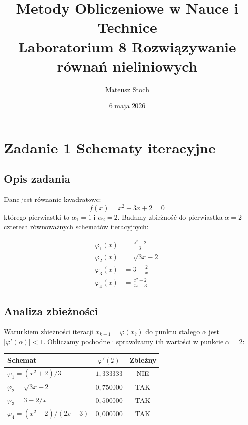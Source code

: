 \documentclass[12pt, a4paper]{article}
\title{
  \textbf{Metody Obliczeniowe w Nauce i Technice} \\[0.5em]
  \large Laboratorium 8 \textendash{} Rozwiązywanie równań nieliniowych
}
\author{Mateusz Stoch}
\date{6 maja 2026}
\begin{document}
\maketitle

\section{Zadanie 1 \textendash{} Schematy iteracyjne}

\subsection{Opis zadania}

Dane jest równanie kwadratowe:
\[
  f(x) = x^2 - 3x + 2 = 0
\]
którego pierwiastki to $\alpha_1 = 1$ i $\alpha_2 = 2$. Badamy zbieżność do pierwiastka $\alpha = 2$ czterech równoważnych schematów iteracyjnych:

\begin{align*}
  \varphi_1(x) &= \frac{x^2 + 2}{3} \\
  \varphi_2(x) &= \sqrt{3x - 2} \\
  \varphi_3(x) &= 3 - \frac{2}{x} \\
  \varphi_4(x) &= \frac{x^2 - 2}{2x - 3}
\end{align*}

\subsection{Analiza zbieżności}

Warunkiem zbieżności iteracji $x_{k+1} = \varphi(x_k)$ do punktu stałego $\alpha$ jest $|\varphi'(\alpha)| < 1$. Obliczamy pochodne i sprawdzamy ich wartości w punkcie $\alpha = 2$:

\begin{center}
\begin{tabular}{l|c|c}
\toprule
Schemat & $|\varphi'(2)|$ & Zbieżny \\
\midrule
$\varphi_1 = (x^2+2)/3$ & $1{,}333333$ & NIE \\
$\varphi_2 = \sqrt{3x-2}$ & $0{,}750000$ & TAK \\
$\varphi_3 = 3 - 2/x$ & $0{,}500000$ & TAK \\
$\varphi_4 = (x^2-2)/(2x-3)$ & $0{,}000000$ & TAK \\
\bottomrule
\end{tabular}
\end{center}
\end{document}
